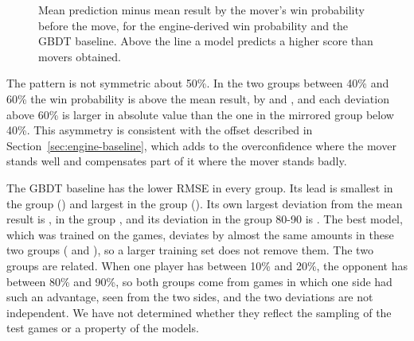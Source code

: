 \documentclass[11pt]{article}
\begin{document}
\begin{table}[htbp]\centering\footnotesize
{}
\caption{Test-set results by the mover's win probability before the move, in
percent. For each group: the number of test positions, the mean result, and
the mean prediction and RMSE of the engine-derived win probability and of the
GBDT baseline. \emph{Baseline's lead} is the difference between the two RMSE
values, without a confidence interval.}
\label{tab:win}
\end{table}

\begin{figure}[htbp]\centering
{}
\caption{Mean prediction minus mean result by the mover's win probability
before the move, for the engine-derived win probability and the GBDT
baseline. Above the line a model predicts a higher score than movers
obtained.}
\label{fig:win-bias}
\end{figure}

The pattern is not symmetric about 50\%. In the two groups between 40\% and
60\% the win probability is above the mean result, by
 and ,
and each deviation above 60\% is larger in absolute value than the one in the
mirrored group below 40\%. This asymmetry is consistent with the offset
described in Section~\ref{sec:engine-baseline}, which adds to the
overconfidence where the mover stands well and compensates part of it where
the mover stands badly.

The GBDT baseline has the lower RMSE in every group. Its lead is smallest in
the group 
() and largest in the group
(). Its own largest deviation from the
mean result is , in the group
, and its deviation in the group
80-90 is . The best model, which was trained
on  the games, deviates by almost the same amounts in
these two groups ( and
), so a larger training set does not remove
them. The two groups are related. When one player has between 10\% and 20\%,
the opponent has between 80\% and 90\%, so both groups come from games in
which one side had such an advantage, seen from the two sides, and the two
deviations are not independent. We have not determined whether they reflect
the sampling of the  test games or a property of the
models.
\end{document}
